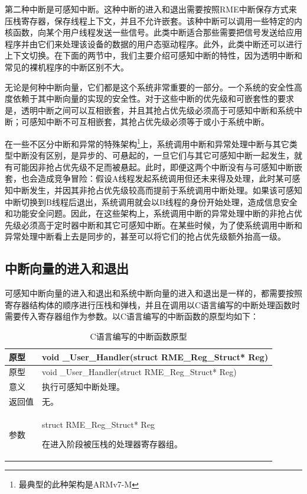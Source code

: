 第二种中断是可感知中断。这种中断的进入和退出需要按照RME中断保存方式来压栈寄存器，保存线程上下文，并且不允许嵌套。该种中断可以调用一些特定的内核函数，向某个用户线程发送一些信号。此类中断适合那些需要把信号发送给应用程序并由它们来处理该设备的数据的用户态驱动程序。此外，此类中断还可以进行上下文切换。在下面的两节中，我们主要介绍可感知中断的特性，因为透明中断和常见的裸机程序的中断区别不大。

无论是何种中断向量，它们都是这个系统非常重要的一部分。一个系统的安全性高度依赖于其中断向量的实现的安全性。对于这些中断的优先级和可嵌套性的要求是，透明中断之间可以互相嵌套，并且其抢占优先级必须高于可感知中断和系统中断；可感知中断不可互相嵌套，其抢占优先级必须等于或小于系统中断。

在一些不区分中断和异常的特殊架构\footnote{最典型的此种架构是ARMv7-M}上，系统调用中断和异常处理中断与其它类型中断没有区别，是异步的、可悬起的，一旦它们与其它可感知中断一起发生，就有可能因非抢占优先级不足而被悬起。此时，即便这两个中断没有与可感知中断嵌套，也会造成竞争冒险：假设A线程发起系统调用但还未来得及处理，此时某可感知中断发生，并因其非抢占优先级较高而提前于系统调用中断处理。如果该可感知中断切换到B线程后退出，系统调用就会以B线程的身份开始处理，造成信息安全和功能安全问题。因此，在这些架构上，系统调用中断的异常处理中断的非抢占优先级必须高于定时器中断和其它可感知中断。在某些时候，为了使系统调用中断和异常处理中断看上去是同步的，甚至可以将它们的抢占优先级额外抬高一级。

\subsection{中断向量的进入和退出}\label{subsec:7-interrupt-vector-entry-and-exit}

可感知中断向量的进入和退出和系统中断向量的进入和退出是一样的，都需要按照寄存器结构体的顺序进行压栈和弹栈，并且在调用以C语言编写的中断处理函数时需要传入寄存器组作为参数。以C语言编写的中断函数的原型均如下：

\begin{xltabular}{\textwidth}{@{}>{\hsize\raggedright\arraybackslash}X>{\hsize\raggedright\arraybackslash}X@{}}
\caption{C语言编写的中断函数原型}\label{tab:7-24-c-interrupt-function-prototype}\\
\toprule
原型 & void \_User\_Handler(struct RME\_Reg\_Struct* Reg)\tabularnewline
\endfirsthead
\toprule
原型 & void \_User\_Handler(struct RME\_Reg\_Struct* Reg)\tabularnewline
\midrule
\endhead
\bottomrule
\endlastfoot
意义 & 执行可感知中断处理。\tabularnewline
返回值 & 无。\tabularnewline
参数\strut
 & struct RME\_Reg\_Struct* Reg

在进入阶段被压栈的处理器寄存器组。\strut
\tabularnewline
\end{xltabular}

